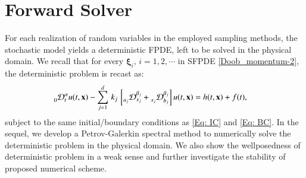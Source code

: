 %
\section{Forward Solver}
\label{Sec: Forward Solver}
%
For each realization of random variables in the employed sampling methods, the stochastic model yields a deterministic FPDE, left to be solved in the physical domain. We recall that for every $\boldsymbol{\xi}_i, \, i=1,2,\cdots$ in SFPDE \eqref{Doob_momentum-2}, the deterministic problem is recast as:
%
\begin{align}
\label{Eq: Deterministic FPDE}
%
\prescript{}{0}{\mathcal{D}}_{t}^{\alpha} u(t,\textbf{x}) 
& - \sum_{j=1}^{d} \, k_{j} \,\left[ \prescript{}{a_j}{\mathcal{D}}_{x_j}^{\beta_j}
+ \prescript{}{x_j}{\mathcal{D}}_{b_j}^{\beta_j} \right]
u(t,\textbf{x}) 
= h(t,\textbf{x}) +  f(t) ,
%
%
\end{align}
%
subject to the same initial/boundary conditions as \eqref{Eq: IC} and \eqref{Eq: BC}. In the sequel, we develop a Petrov-Galerkin spectral method to numerically solve the deterministic problem in the physical domain. We also show the wellposedness of deterministic problem in a weak sense and further investigate the stability of proposed numerical scheme.



%
